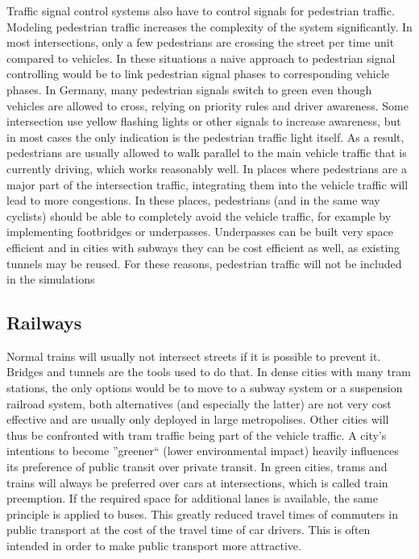 Traffic signal control systems also have to control signals for pedestrian traffic. Modeling pedestrian traffic increases the complexity of the system significantly. In most intersections, only a few pedestrians are crossing the street per time unit compared to vehicles. In these situations a naive approach to pedestrian signal controlling would be to link pedestrian signal phases to corresponding vehicle phases. In Germany, many pedestrian signals switch to green even though vehicles are allowed to cross, relying on priority rules and driver awareness. Some intersection use yellow flashing lights or other signals to increase awareness, but in most cases the only indication is the pedestrian traffic light itself. As a result, pedestrians are usually allowed to walk parallel to the main vehicle traffic that is currently driving, which works reasonably well. In places where pedestrians are a major part of the intersection traffic, integrating them into the vehicle traffic will lead to more congestions. In these places, pedestrians (and in the same way cyclists) should be able to completely avoid the vehicle traffic, for example by implementing footbridges or underpasses. Underpasses can be built very space efficient and in cities with subways they can be cost efficient as well, as existing tunnels may be reused. For these reasons, pedestrian traffic will not be included in the simulations

\subsection*{Railways}

Normal trains will usually not intersect streets if it is possible to prevent it. Bridges and tunnels are the tools used to do that. In dense cities with many tram stations, the only options would be to move to a subway system or a suspension railroad system, both alternatives (and especially the latter) are not very cost effective and are usually only deployed in large metropolises. Other cities will thus be confronted with tram traffic being part of the vehicle traffic. A city's intentions to become ''greener`` (lower environmental impact) heavily influences its preference of public transit over private transit. In green cities, trams and trains will always be preferred over cars at intersections, which is called train preemption. If the required space for additional lanes is available, the same principle is applied to buses. This greatly reduced travel times of commuters in public transport at the cost of the travel time of car drivers. This is often intended in order to make public transport more attractive.

